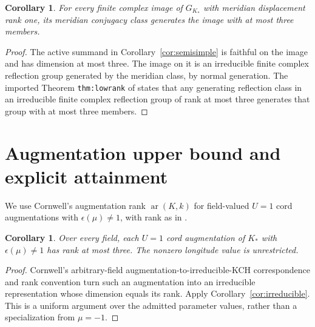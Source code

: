 \documentclass[11pt]{article}
\newtheorem{corollary}[theorem]{Corollary}
\newcommand{\ar}{\operatorname{ar}}
\begin{document}
\begin{corollary}\label{cor:finiteclass}
For every finite complex image of $G_{K_*}$ with meridian
displacement rank one, its meridian conjugacy class generates
the image with at most three members.
\end{corollary}
\begin{proof}
The active summand in Corollary~\ref{cor:semisimple} is faithful
on the image and has dimension at most three.
The image on it is an irreducible finite complex reflection
group generated by the meridian class, by normal generation.
The imported Theorem \texttt{thm:lowrank} of \cite{finite}
states that any generating reflection class in an irreducible
finite complex reflection group of rank at most three generates
that group with at most three members.
\end{proof}

\section{Augmentation upper bound and explicit attainment}

We use Cornwell's augmentation rank $\ar(K,k)$ for field-valued
$U=1$ cord augmentations with $\epsilon(\mu)\ne1$,
with rank as in \cite[Definition~1.8]{cornwell}.

\begin{corollary}\label{cor:augmentation}
Over every field, each $U=1$ cord augmentation of $K_*$
with $\epsilon(\mu)\ne1$ has rank at most three.
The nonzero longitude value is unrestricted.
\end{corollary}
\begin{proof}
Cornwell's arbitrary-field augmentation-to-irreducible-KCH
correspondence and rank convention
\cite[Theorem~1.2 and Definition~1.8]{cornwell}
turn such an augmentation into an irreducible representation
whose dimension equals its rank.
Apply Corollary~\ref{cor:irreducible}.
This is a uniform argument over the admitted parameter values,
rather than a specialization from $\mu=-1$.
\end{proof}
\end{document}
